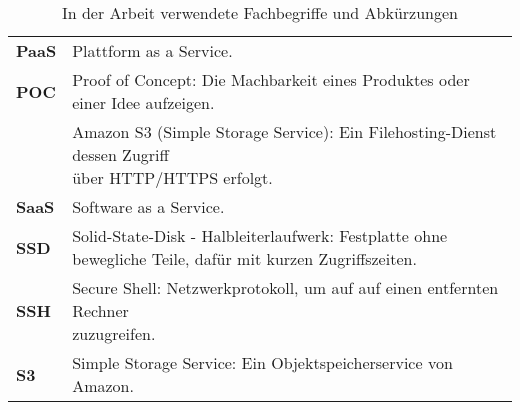\begin{table}[!htbp]
\begin{tabular}{p{}p{}}
	\textbf{PaaS} & Plattform as a Service.\\
	\textbf{POC} & Proof of Concept: Die Machbarkeit eines Produktes oder einer Idee aufzeigen.\\
	\makecell[l]{\textbf{S3}} & \makecell[l]{Amazon S3 (Simple Storage Service): Ein Filehosting-Dienst dessen Zugriff\\ über HTTP/HTTPS erfolgt.}\\
	\textbf{SaaS} & Software as a Service.\\
	\textbf{SSD} &  Solid-State-Disk - Halbleiterlaufwerk: Festplatte ohne bewegliche Teile, dafür mit kurzen Zugriffszeiten.\\
	\textbf{SSH} & \makecell[l]{Secure Shell: Netzwerkprotokoll, um auf auf einen entfernten Rechner\\ zuzugreifen.}\\
	\textbf{S3} & Simple Storage Service: Ein Objektspeicherservice von Amazon.\\
\end{tabular}
\caption{\label{tab:fachbegriffe}In der Arbeit verwendete Fachbegriffe und Abkürzungen}
\end{table}